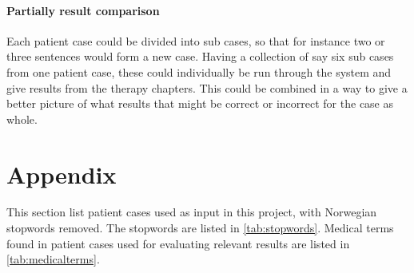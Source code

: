 \documentclass[a4paper, 11pt]{article}
\begin{document}
\paragraph{Partially result comparison}
Each patient case could be divided into sub cases, so that for instance two or three sentences would form a new case. Having a collection of say six sub cases from one patient case, these could individually be run through the system and give results from the therapy chapters. This could be combined in a way to give a better picture of what results that might be correct or incorrect for the case as whole.

\appendix
\section{Appendix}
\label{appendix}
This section list patient cases used as input in this project, with Norwegian
stopwords removed. The stopwords are listed in \autoref{tab:stopwords}.
Medical terms found in patient cases used for evaluating relevant results are
listed in \autoref{tab:medicalterms}.



\end{document}
